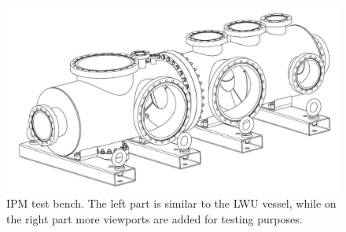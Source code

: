 \begin{figure}[!ht]
	\begin{center}
		\includegraphics[width=\textwidth]{04_IPHI_Test/figures/fig000_Testbench.png}
	\end{center}
	\caption[IPM test bench]{IPM test bench. The left part is similar to the LWU vessel, while on the right part more viewports are added for testing purposes.}
	\label{chap4:Testbench}
\end{figure}
